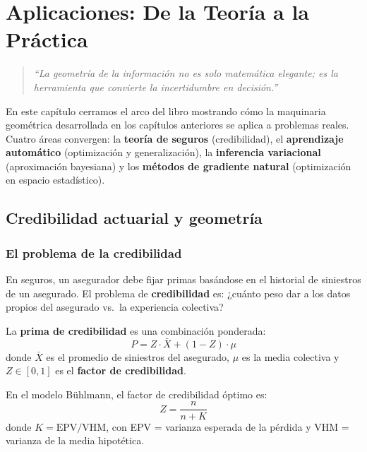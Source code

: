 
\chapter{Aplicaciones: De la Teoría a la Práctica}

\begin{quotation}
	\itshape
	``La geometría de la información no es solo matemática elegante; es la herramienta que convierte la incertidumbre en decisión.''
\end{quotation}

En este capítulo cerramos el arco del libro mostrando cómo la maquinaria geométrica desarrollada en los capítulos anteriores se aplica a problemas reales.  Cuatro áreas convergen: la \textbf{teoría de seguros} (credibilidad), el \textbf{aprendizaje automático} (optimización y generalización), la \textbf{inferencia variacional} (aproximación bayesiana) y los \textbf{métodos de gradiente natural} (optimización en espacio estadístico).

\section{Credibilidad actuarial y geometría}

\subsection{El problema de la credibilidad}

En seguros, un asegurador debe fijar primas basándose en el historial de siniestros de un asegurado.  El problema de \textbf{credibilidad} es: ¿cuánto peso dar a los datos propios del asegurado vs.\ la experiencia colectiva?

\begin{definition}
	La \textbf{prima de credibilidad} es una combinación ponderada:
	\[
	P = Z \cdot \bar{X} + (1-Z) \cdot \mu
	\]
	donde $\bar{X}$ es el promedio de siniestros del asegurado, $\mu$ es la media colectiva y $Z \in [0,1]$ es el \textbf{factor de credibilidad}.
\end{definition}

\begin{theorem}
	En el modelo Bühlmann, el factor de credibilidad óptimo es:
	\[
	Z = \frac{n}{n + K}
	\]
	donde $K = \text{EPV}/\text{VHM}$, con EPV = varianza esperada de la pérdida y VHM = varianza de la media hipotética.
\end{theorem}

